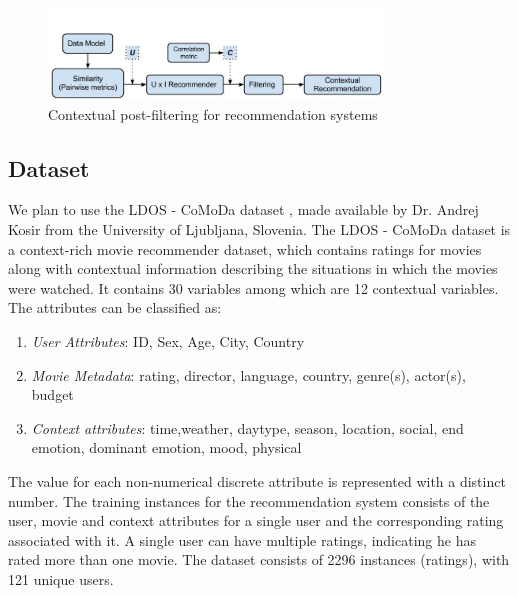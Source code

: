 \documentclass{article}
\begin{document}
\begin{figure}[H]
\centering
\includegraphics[width=3.5in]{archdiagram.jpg}
\caption{Contextual post-filtering for recommendation systems}
\label{archdiag}
\end{figure}

\subsection{Dataset}
We plan to use the LDOS - CoMoDa dataset \cite{kovsir2011database}, made available by Dr. Andrej Kosir from the University of Ljubljana, Slovenia. The LDOS - CoMoDa dataset is a context-rich movie recommender dataset, which contains ratings for movies along with contextual information describing the situations in which the movies were watched. 
It contains 30 variables among which are 12 contextual variables. The attributes can be classified as:
\begin{enumerate}
\item \emph{User Attributes}: ID, Sex, Age, City, Country
\item \emph{Movie Metadata}: rating, director, language, country, genre(s), actor(s), budget
\item \emph{Context attributes}: time,weather, daytype, season, location, social, end emotion, dominant emotion, mood, physical
\end{enumerate}
The value for each non-numerical discrete attribute is represented with a distinct number. The training instances for the recommendation system consists of the user, movie and context attributes for a single user and the corresponding rating associated with it. A single user can have multiple ratings, indicating he has rated more than one movie. The dataset consists of 2296 instances (ratings), with 121 unique users. 
\end{document}
